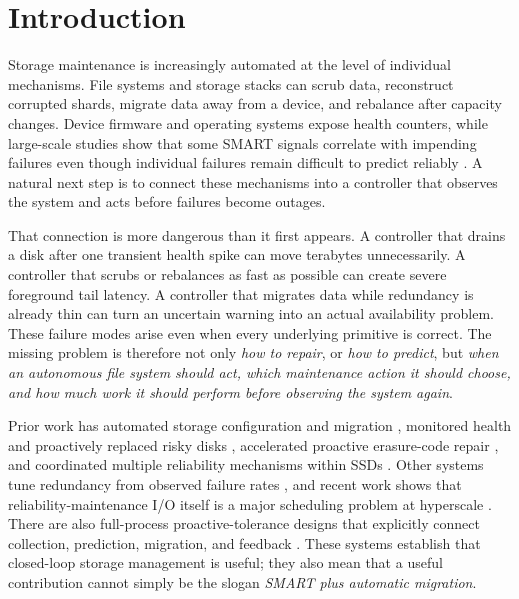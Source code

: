 \section{Introduction}
\label{sec:introduction}

Storage maintenance is increasingly automated at the level of individual mechanisms. File systems and storage stacks can scrub data, reconstruct corrupted shards, migrate data away from a device, and rebalance after capacity changes. Device firmware and operating systems expose health counters, while large-scale studies show that some SMART signals correlate with impending failures even though individual failures remain difficult to predict reliably \citep{pinheiro2007failure,lu2020smarter}. A natural next step is to connect these mechanisms into a controller that observes the system and acts before failures become outages.

That connection is more dangerous than it first appears. A controller that drains a disk after one transient health spike can move terabytes unnecessarily. A controller that scrubs or rebalances as fast as possible can create severe foreground tail latency. A controller that migrates data while redundancy is already thin can turn an uncertain warning into an actual availability problem. These failure modes arise even when every underlying primitive is correct. The missing problem is therefore not only \emph{how to repair}, or \emph{how to predict}, but \emph{when an autonomous file system should act, which maintenance action it should choose, and how much work it should perform before observing the system again}.

Prior work has automated storage configuration and migration \citep{anderson2002hippodrome,sundaram2006migration}, monitored health and proactively replaced risky disks \citep{ma2015raidshield}, accelerated proactive erasure-code repair \citep{li2022fastpr}, and coordinated multiple reliability mechanisms within SSDs \citep{kim2019ssd}. Other systems tune redundancy from observed failure rates \citep{kadekodi2019heart}, and recent work shows that reliability-maintenance I/O itself is a major scheduling problem at hyperscale \citep{athlur2026declarative}. There are also full-process proactive-tolerance designs that explicitly connect collection, prediction, migration, and feedback \citep{yang2020proactive}. These systems establish that closed-loop storage management is useful; they also mean that a useful contribution cannot simply be the slogan \emph{SMART plus automatic migration}.


